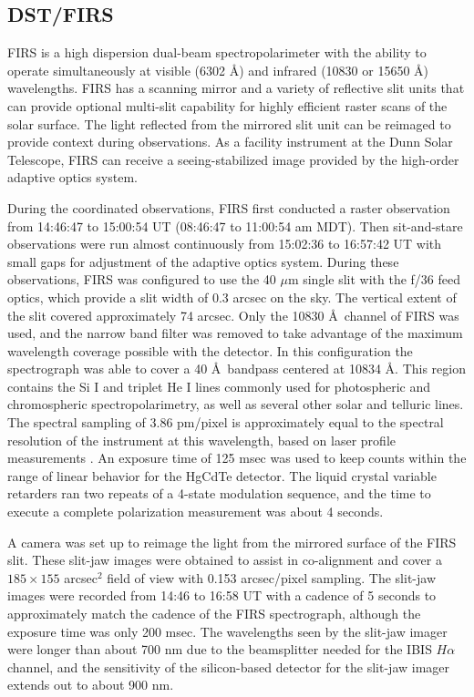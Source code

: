 \documentclass[twocolumn]{aastex62}
\newcommand{\halpha}{\ensuremath{H\alpha}}
\begin{document}
\subsection{DST/FIRS}
FIRS is a high dispersion dual-beam spectropolarimeter with the ability to operate simultaneously at visible (6302 \AA) and infrared (10830 or 15650 \AA) wavelengths.  FIRS has a scanning mirror and a variety of reflective slit units that can provide optional multi-slit capability for highly efficient raster scans of the solar surface.  The light reflected from the mirrored slit unit can be reimaged to provide context during observations.  As a facility instrument at the Dunn Solar Telescope, FIRS can receive a seeing-stabilized image provided by the high-order adaptive optics system.

During the coordinated observations, FIRS first conducted a raster observation from 14:46:47 to 15:00:54 UT (08:46:47 to 11:00:54 am MDT).  Then sit-and-stare observations were run almost continuously from 15:02:36 to 16:57:42 UT with small gaps for adjustment of the adaptive optics system.  During these observations, FIRS was configured to use the 40 $\mu$m single slit with the f/36 feed optics, which provide a slit width of 0.3 arcsec on the sky.  The vertical extent of the slit covered approximately 74 arcsec.  Only the 10830 \AA\ channel of FIRS was used, and the narrow band filter was removed to take advantage of the maximum wavelength coverage possible with the detector.  In this configuration the spectrograph was able to cover a 40 \AA\ bandpass centered at 10834 \AA.  This region contains the Si I and triplet He I lines commonly used for photospheric and chromospheric  spectropolarimetry, as well as several other solar and telluric lines.  The spectral sampling of 3.86 pm/pixel is approximately equal to the spectral resolution of the instrument at this wavelength, based on laser profile measurements \citep{2011Jaeggli_PHD}.  An exposure time of 125 msec was used to keep counts within the range of linear behavior for the HgCdTe detector.  The liquid crystal variable retarders ran two repeats of a 4-state modulation sequence, and the time to execute a complete polarization measurement was about 4 seconds.

A camera was set up to reimage the light from the mirrored surface of the FIRS slit.  These slit-jaw images were obtained to assist in co-alignment and cover a $185\times155$ arcsec$^2$ field of view with 0.153 arcsec/pixel sampling.  The slit-jaw images were recorded from 14:46 to 16:58 UT with a cadence of 5 seconds to approximately match the cadence of the FIRS spectrograph, although the exposure time was only 200 msec.  The wavelengths seen by the slit-jaw imager  were longer than about 700 nm due to the beamsplitter needed for the IBIS \halpha{} channel, and the sensitivity of the silicon-based detector for the slit-jaw imager extends out to about 900 nm.
\end{document}

